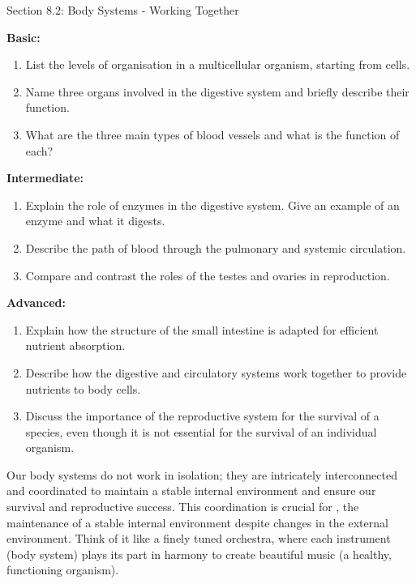 \begin{tieredquestions}{Section 8.2: Body Systems - Working Together}

\textbf{Basic:}
\begin{enumerate}
    \item List the levels of organisation in a multicellular organism, starting from cells.
    \item Name three organs involved in the digestive system and briefly describe their function.
    \item What are the three main types of blood vessels and what is the function of each?
\end{enumerate}

\textbf{Intermediate:}
\begin{enumerate}
    \item Explain the role of enzymes in the digestive system. Give an example of an enzyme and what it digests.
    \item Describe the path of blood through the pulmonary and systemic circulation.
    \item Compare and contrast the roles of the testes and ovaries in reproduction.
\end{enumerate}

\textbf{Advanced:}
\begin{enumerate}
    \item  Explain how the structure of the small intestine is adapted for efficient nutrient absorption.
    \item  Describe how the digestive and circulatory systems work together to provide nutrients to body cells.
    \item  Discuss the importance of the reproductive system for the survival of a species, even though it is not essential for the survival of an individual organism.
\end{enumerate}
\end{tieredquestions}


\FloatBarrier

Our body systems do not work in isolation; they are intricately interconnected and coordinated to maintain a stable internal environment and ensure our survival and reproductive success. This coordination is crucial for , the maintenance of a stable internal environment despite changes in the external environment.  Think of it like a finely tuned orchestra, where each instrument (body system) plays its part in harmony to create beautiful music (a healthy, functioning organism).

